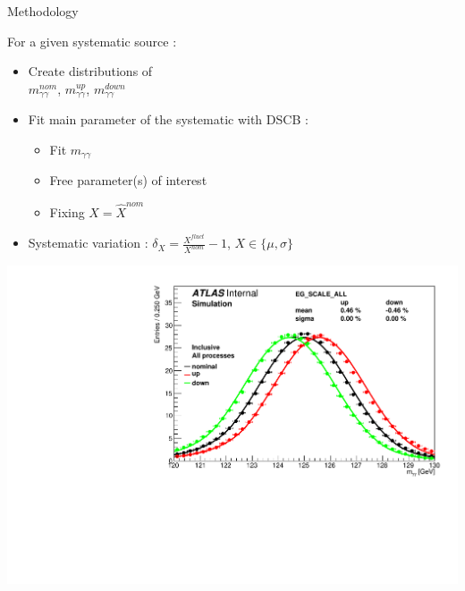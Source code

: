 \begin{frame}{Methodology}
  \begin{minipage}{0.49\linewidth}
    For a given systematic source :
    \begin{itemize}
    \item Create distributions of \\ $m_{\gamma\gamma}^{nom}$, $m_{\gamma\gamma}^{up}$, $m_{\gamma \gamma}^{down}$
    \item Fit main parameter of the systematic with DSCB :
      \begin{itemize}
      \item Fit  $m_{\gamma\gamma}$
      \item Free parameter(s) of interest
      \item Fixing $X=\hat{X}^{nom}$
      \end{itemize}
      \item Systematic variation : $\delta_X=\frac{X^{fluct}}{X^{nom}}-1$, $X\in \{\mu , \sigma\}$
      \end{itemize}
    \end{minipage}
    \hfill
    \begin{minipage}{0.49\linewidth}
      \includegraphics[width=\linewidth]{plots/h013_EG_SCALE_ALL_0.pdf}
    \end{minipage}
    \vfill
    

\end{frame}

